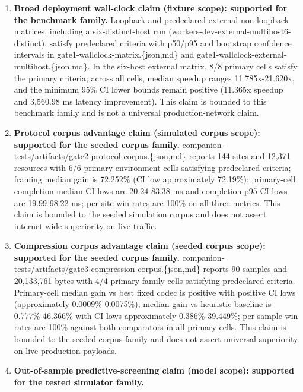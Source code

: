\documentclass[
]{article}
\providecommand{\tightlist}{%
  \setlength{\itemsep}{0pt}\setlength{\parskip}{0pt}}
\begin{document}
\begin{enumerate}
\def\labelenumi{\arabic{enumi}.}
\tightlist
\item
  \textbf{Broad deployment wall-clock claim (fixture scope): supported
  for the benchmark family.} Loopback and predeclared external
  non-loopback matrices, including a six-distinct-host run
  (workers-dev-external-multihost6-distinct), satisfy predeclared
  criteria with p50/p95 and bootstrap confidence intervals in
  gate1-wallclock-matrix.\{json,md\} and
  gate1-wallclock-external-multihost.\{json,md\}. In the six-host
  external matrix, 8/8 primary cells satisfy the primary criteria;
  across all cells, median speedup ranges 11.785x-21.620x, and the
  minimum 95\% CI lower bounds remain positive (11.365x speedup and
  3,560.98 ms latency improvement). This claim is bounded to this
  benchmark family and is not a universal production-network claim.\\
\item
  \textbf{Protocol corpus advantage claim (simulated corpus scope):
  supported for the seeded corpus family.}
  companion-tests/artifacts/gate2-protocol-corpus.\{json,md\} reports
  144 sites and 12,371 resources with 6/6 primary environment cells
  satisfying predeclared criteria; framing median gain is 72.252\% (CI
  low approximately 72.19\%); primary-cell completion-median CI lows are
  20.24-83.38 ms and completion-p95 CI lows are 19.99-98.22 ms; per-site
  win rates are 100\% on all three metrics. This claim is bounded to the
  seeded simulation corpus and does not assert internet-wide superiority
  on live traffic.\\
\item
  \textbf{Compression corpus advantage claim (seeded corpus scope):
  supported for the seeded corpus family.}
  companion-tests/artifacts/gate3-compression-corpus.\{json,md\} reports
  90 samples and 20,133,761 bytes with 4/4 primary family cells
  satisfying predeclared criteria. Primary-cell median gain vs best
  fixed codec is positive with positive CI lows (approximately
  0.0009\%-0.0075\%); median gain vs heuristic baseline is
  0.777\%-46.366\% with CI lows approximately 0.386\%-39.449\%;
  per-sample win rates are 100\% against both comparators in all primary
  cells. This claim is bounded to the seeded corpus family and does not
  assert universal superiority on live production payloads.\\
\item
  \textbf{Out-of-sample} \textbf{predictive-screening claim (model
  scope): supported for the tested simulator family.}

\end{enumerate}
\end{document}
